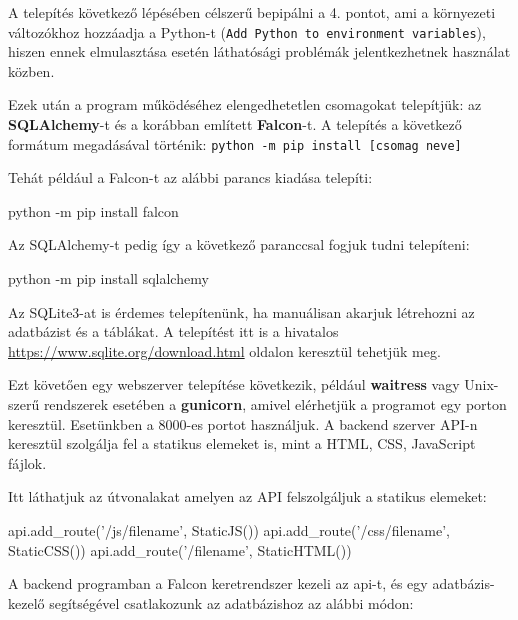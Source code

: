 A telepítés következő lépésében célszerű bepipálni a 4. pontot, ami a környezeti változókhoz hozzáadja a Python-t (\texttt{Add Python to environment variables}), hiszen ennek elmulasztása esetén láthatósági problémák jelentkezhetnek használat közben.


Ezek után a program működéséhez elengedhetetlen csomagokat telepítjük: az \textbf{SQLAlchemy}-t és a korábban említett \textbf{Falcon}-t. A telepítés a következő formátum megadásával történik: \texttt{python -m pip install [csomag neve]}

Tehát például a Falcon-t az alábbi parancs kiadása telepíti:

\begin{python}
python -m pip install falcon
\end{python}

Az SQLAlchemy-t pedig így a következő paranccsal fogjuk tudni telepíteni:
\begin{python}
python -m pip install sqlalchemy
\end{python}

Az SQLite3-at is érdemes telepítenünk, ha manuálisan akarjuk létrehozni az adatbázist és a táblákat. A telepítést itt is a hivatalos \url{https://www.sqlite.org/download.html} oldalon keresztül tehetjük meg.

Ezt követően egy webszerver telepítése következik, például \textbf{waitress} vagy Unix-szerű rendszerek esetében a \textbf{gunicorn}, amivel elérhetjük a programot egy porton keresztül. Esetünkben a 8000-es portot használjuk. A backend szerver API-n keresztül szolgálja fel a statikus elemeket is, mint a HTML, CSS, JavaScript fájlok.
 
Itt láthatjuk az útvonalakat amelyen az API felszolgáljuk a statikus elemeket:

\begin{python}
api.add_route('/js/{filename}', StaticJS())
api.add_route('/css/{filename}', StaticCSS())
api.add_route('/{filename}', StaticHTML())
\end{python}

A backend programban a Falcon keretrendszer kezeli az api-t, és egy adatbázis-kezelő segítségével csatlakozunk az adatbázishoz az alábbi módon:

